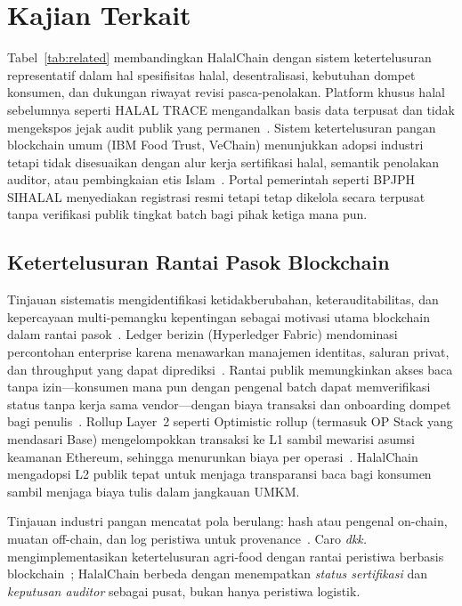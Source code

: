 \section{Kajian Terkait}
\label{sec:related}

Tabel~\ref{tab:related} membandingkan HalalChain dengan sistem ketertelusuran representatif dalam hal spesifisitas halal, desentralisasi, kebutuhan dompet konsumen, dan dukungan riwayat revisi pasca-penolakan.
Platform khusus halal sebelumnya seperti HALAL TRACE mengandalkan basis data terpusat dan tidak mengekspos jejak audit publik yang permanen~\cite{rashid2018halal}.
Sistem ketertelusuran pangan blockchain umum (IBM Food Trust, VeChain) menunjukkan adopsi industri tetapi tidak disesuaikan dengan alur kerja sertifikasi halal, semantik penolakan auditor, atau pembingkaian etis Islam~\cite{kamilaris2019blockchain,casino2021systematic,kamath2018blockchain}.
Portal pemerintah seperti BPJPH SIHALAL menyediakan registrasi resmi tetapi tetap dikelola secara terpusat tanpa verifikasi publik tingkat batch bagi pihak ketiga mana pun.



\subsection{Ketertelusuran Rantai Pasok Blockchain}
Tinjauan sistematis mengidentifikasi ketidakberubahan, keterauditabilitas, dan kepercayaan multi-pemangku kepentingan sebagai motivasi utama blockchain dalam rantai pasok~\cite{casino2021systematic,kshetri2018blockchain,galvez2018future}.
Ledger berizin (Hyperledger Fabric) mendominasi percontohan enterprise karena menawarkan manajemen identitas, saluran privat, dan throughput yang dapat diprediksi~\cite{andoni2019blockchain,abeyratne2016blockchain}.
Rantai publik memungkinkan akses baca tanpa izin---konsumen mana pun dengan pengenal batch dapat memverifikasi status tanpa kerja sama vendor---dengan biaya transaksi dan onboarding dompet bagi penulis~\cite{underwood2016blockchain}.
Rollup Layer~2 seperti Optimistic rollup (termasuk OP Stack yang mendasari Base) mengelompokkan transaksi ke L1 sambil mewarisi asumsi keamanan Ethereum, sehingga menurunkan biaya per operasi~\cite{kalodner2018arbitrum,optimism2024spec}.
HalalChain mengadopsi L2 publik tepat untuk menjaga transparansi baca bagi konsumen sambil menjaga biaya tulis dalam jangkauan UMKM.

Tinjauan industri pangan mencatat pola berulang: hash atau pengenal on-chain, muatan off-chain, dan log peristiwa untuk provenance~\cite{rejeb2020blockchain,kouhizadeh2018blockchain}.
Caro \emph{dkk.} mengimplementasikan ketertelusuran agri-food dengan rantai peristiwa berbasis blockchain~\cite{caro2018blockchain}; HalalChain berbeda dengan menempatkan \emph{status sertifikasi} dan \emph{keputusan auditor} sebagai pusat, bukan hanya peristiwa logistik.

